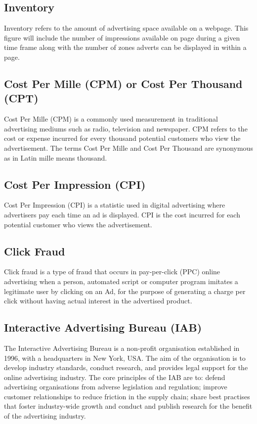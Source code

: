 \documentclass[12pt]{article}
\begin{document}
\subsection{Inventory}
Inventory refers to the amount of advertising space available on a webpage. This figure will include the number of impressions available on page during a given time frame along with the number of zones adverts can be displayed in within a page. 

\subsection{Cost Per Mille (CPM) or Cost Per Thousand (CPT)} \label{cpm}
Cost Per Mille (CPM) is a commonly used measurement in traditional advertising mediums such as radio, television and newspaper. CPM refers to the cost or expense incurred for every thousand potential customers who view the advertisement. The terms Cost Per Mille and Cost Per Thousand are synonymous as in Latin mille means thousand. 

\subsection{Cost Per Impression (CPI)}
Cost Per Impression (CPI) is a statistic used in digital advertising where advertisers pay each time an ad is displayed. CPI is the cost incurred for each potential customer who views the advertisement.

\subsection{Click Fraud}
Click fraud is a type of fraud that occurs in pay-per-click (PPC) online advertising when a person, automated script or computer program imitates a legitimate user by clicking on an Ad, for the purpose of generating a charge per click without having actual interest in the advertised product.

\subsection{Interactive Advertising Bureau (IAB)}
The Interactive Advertising Bureau is a non-profit organisation established in 1996, with a headquarters in New York, USA. The aim of the organisation is to develop industry standards, conduct research, and provides legal support for the online advertising industry. The core principles of the IAB are to: defend advertising organisations from adverse legislation and regulation; improve customer relationships to reduce friction in the supply chain; share best practises that foster industry-wide growth and conduct and publish research for the benefit of the advertising industry.
\end{document}
